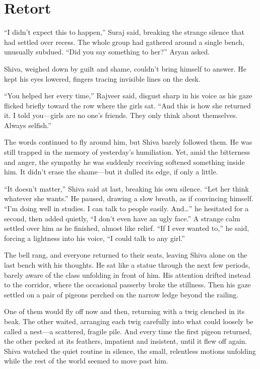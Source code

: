 \chapter{Retort}
``I didn't expect this to happen,'' Suraj said, breaking the strange silence that had settled over recess. The whole group had gathered around a single bench, unusually subdued.
``Did you say something to her?'' Aryan asked.

Shiva, weighed down by guilt and shame, couldn't bring himself to answer. He kept his eyes lowered, fingers tracing invisible lines on the desk.

``You helped her every time,'' Rajveer said, disgust sharp in his voice as his gaze flicked briefly toward the row where the girls sat. ``And this is how she returned it. I told you—girls are no one's friends. They only think about themselves. Always selfish.''

The words continued to fly around him, but Shiva barely followed them. He was still trapped in the memory of yesterday's humiliation. Yet, amid the bitterness and anger, the sympathy he was suddenly receiving softened something inside him. It didn't erase the shame—but it dulled its edge, if only a little.

``It doesn't matter,'' Shiva said at last, breaking his own silence. ``Let her think whatever she wants.'' He paused, drawing a slow breath, as if convincing himself. ``I'm doing well in studies. I can talk to people easily. And…'' he hesitated for a second, then added quietly, ``I don't even have an ugly face.'' A strange calm settled over him as he finished, almost like relief. ``If I ever wanted to,'' he said, forcing a lightness into his voice, ``I could talk to any girl.''

The bell rang, and everyone returned to their seats, leaving Shiva alone on the last bench with his thoughts. He sat like a statue through the next few periods, barely aware of the class unfolding in front of him. His attention drifted instead to the corridor, where the occasional passerby broke the stillness. Then his gaze settled on a pair of pigeons perched on the narrow ledge beyond the railing.

One of them would fly off now and then, returning with a twig clenched in its beak. The other waited, arranging each twig carefully into what could loosely be called a nest—a scattered, fragile pile. And every time the first pigeon returned, the other pecked at its feathers, impatient and insistent, until it flew off again. Shiva watched the quiet routine in silence, the small, relentless motions unfolding while the rest of the world seemed to move past him.

